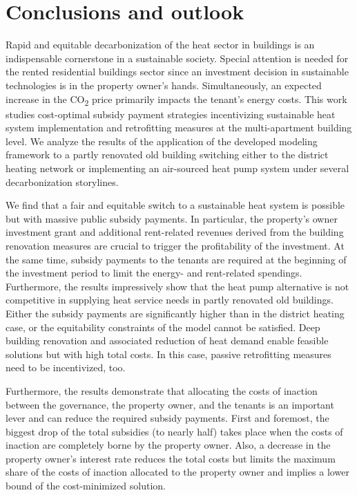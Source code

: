 \section{Conclusions and outlook}\label{conclusions}
Rapid and equitable decarbonization of the heat sector in buildings is an indispensable cornerstone in a sustainable society. Special attention is needed for the rented residential buildings sector since an investment decision in sustainable technologies is in the property owner's hands. Simultaneously, an expected increase in the CO\textsubscript{2} price primarily impacts the tenant's energy costs. This work studies cost-optimal subsidy payment strategies incentivizing sustainable heat system implementation and retrofitting measures at the multi-apartment building level. We analyze the results of the application of the developed modeling framework to a partly renovated old building switching either to the district heating network or implementing an air-sourced heat pump system under several decarbonization storylines. \vspace{0.5cm}

We find that a fair and equitable switch to a sustainable heat system is possible but with massive public subsidy payments. In particular, the property's owner investment grant and additional rent-related revenues derived from the building renovation measures are crucial to trigger the profitability of the investment. At the same time, subsidy payments to the tenants are required at the beginning of the investment period to limit the energy- and rent-related spendings. Furthermore, the results impressively show that the heat pump alternative is not competitive in supplying heat service needs in partly renovated old buildings. Either the subsidy payments are significantly higher than in the district heating case, or the equitability constraints of the model cannot be satisfied. Deep building renovation and associated reduction of heat demand enable feasible solutions but with high total costs. In this case, passive retrofitting measures need to be incentivized, too.\vspace{0.5cm}

Furthermore, the results demonstrate that allocating the costs of inaction between the governance, the property owner, and the tenants is an important lever and can reduce the required subsidy payments. First and foremost, the biggest drop of the total subsidies (to nearly half) takes place when the costs of inaction are completely borne by the property owner. Also, a decrease in the property owner's interest rate reduces the total costs but limits the maximum share of the costs of inaction allocated to the property owner and implies a lower bound of the cost-minimized solution.\vspace{0.5cm}

